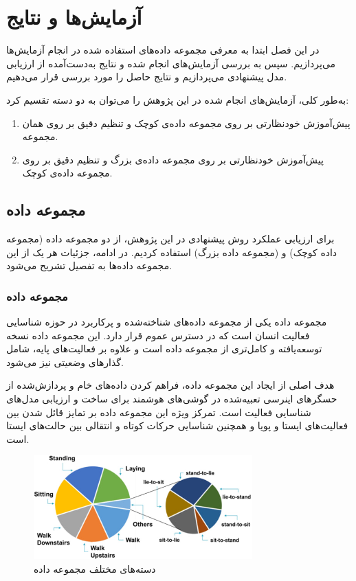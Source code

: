 \chapter{آزمایش‌ها و نتایج}
\clearpage

در این فصل ابتدا به معرفی مجموعه داده‌های استفاده شده در انجام آزمایش‌ها می‌پردازیم. سپس به بررسی آزمایش‌های انجام شده و نتایج به‌دست‌آمده از ارزیابی مدل پیشنهادی می‌پردازیم و نتایج حاصل را مورد بررسی قرار می‌دهیم.

به‌طور کلی، آزمایش‌های انجام شده در این پژوهش را می‌توان به دو دسته تقسیم کرد:
\begin{enumerate}
    \item پیش‌آموزش خودنظارتی بر روی مجموعه داده‌ی کوچک و تنظیم دقیق بر روی همان مجموعه.
    \item پیش‌آموزش خودنظارتی بر روی مجموعه داده‌ی بزرگ و تنظیم دقیق بر روی مجموعه داده‌ی کوچک.
\end{enumerate}

\section{مجموعه داده}

برای ارزیابی عملکرد روش پیشنهادی در این پژوهش، از دو مجموعه داده \cite{reyes2015smartphone}
(مجموعه داده کوچک) و
\cite{vavoulas2016mobiact}
(مجموعه داده بزرگ)
استفاده کردیم. در ادامه، جزئیات هر یک از این مجموعه داده‌ها به تفصیل تشریح می‌شود.

\subsection{مجموعه داده }

مجموعه داده 
یکی از مجموعه داده‌های شناخته‌شده و پرکاربرد در حوزه شناسایی فعالیت انسان است که در دسترس عموم قرار دارد. این مجموعه داده نسخه توسعه‌یافته و کامل‌تری از مجموعه داده
\cite{anguita2013public}
است و علاوه بر فعالیت‌های پایه، شامل گذارهای وضعیتی نیز می‌شود.

هدف اصلی از ایجاد این مجموعه داده، فراهم کردن داده‌های خام و پردازش‌شده از حسگرهای اینرسی تعبیه‌شده در گوشی‌های هوشمند برای ساخت و ارزیابی مدل‌های شناسایی فعالیت است. تمرکز ویژه این مجموعه داده بر تمایز قائل شدن بین فعالیت‌های ایستا و پویا و همچنین شناسایی حرکات کوتاه و انتقالی بین حالت‌های ایستا است.

\begin{figure}[htb!]
\centering
\includegraphics[width=0.75\textwidth]{Images/Chapter4/hapt-classes.png}
\caption{دسته‌های مختلف مجموعه داده }
\label{fig:hapt-classes}
\end{figure}

